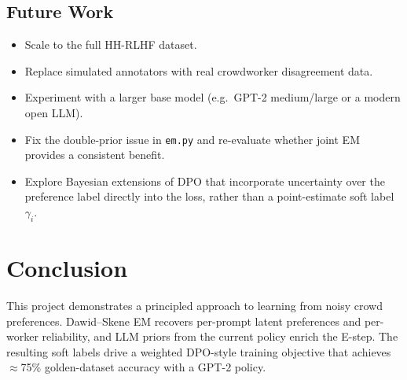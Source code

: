 \documentclass[11pt, a4paper]{article}
\begin{document}
\subsection{Future Work}

\begin{itemize}[noitemsep]
  \item Scale to the full HH-RLHF dataset.
  \item Replace simulated annotators with real crowdworker disagreement data.
  \item Experiment with a larger base model (e.g.\ GPT-2 medium/large or a modern open LLM).
  \item Fix the double-prior issue in \texttt{em.py} and re-evaluate whether joint EM
        provides a consistent benefit.
  \item Explore Bayesian extensions of DPO that incorporate uncertainty over the preference
        label directly into the loss, rather than a point-estimate soft label $\gamma_i$.
\end{itemize}

\newpage

\section{Conclusion}

This project demonstrates a principled approach to learning from noisy crowd preferences.
Dawid--Skene EM recovers per-prompt latent preferences and per-worker reliability, and
LLM priors from the current policy enrich the E-step. The resulting soft labels drive a
weighted DPO-style training objective that achieves $\approx$75\% golden-dataset accuracy
with a GPT-2 policy.

\newpage
\end{document}
